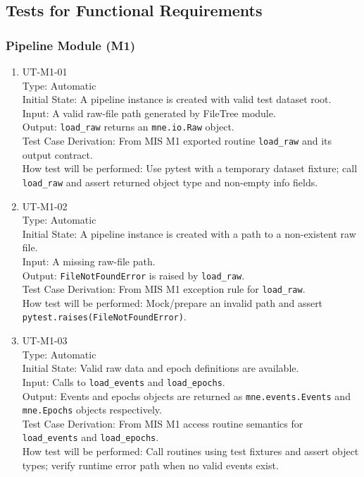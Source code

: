\documentclass[12pt, titlepage]{article}
\begin{document}
\subsection{Tests for Functional Requirements}




\subsubsection{Pipeline Module (M1)}

\begin{enumerate}

\item{UT-M1-01\\}
    Type: Automatic \\
    Initial State: A pipeline instance is created with valid test dataset root. \\
    Input: A valid raw-file path generated by FileTree module. \\
    Output: \lstinline|load_raw| returns an \lstinline|mne.io.Raw| object. \\
    Test Case Derivation: From MIS M1 exported routine \lstinline|load_raw| and its output contract. \\
    How test will be performed: Use pytest with a temporary dataset fixture; call \lstinline|load_raw| and assert returned object type and non-empty info fields.

\item{UT-M1-02\\}
    Type: Automatic \\
    Initial State: A pipeline instance is created with a path to a non-existent raw file. \\
    Input: A missing raw-file path. \\
    Output: \lstinline|FileNotFoundError| is raised by \lstinline|load_raw|. \\
    Test Case Derivation: From MIS M1 exception rule for \lstinline|load_raw|. \\
    How test will be performed: Mock/prepare an invalid path and assert \lstinline|pytest.raises(FileNotFoundError)|.

\item{UT-M1-03\\}
    Type: Automatic \\
    Initial State: Valid raw data and epoch definitions are available. \\
    Input: Calls to \lstinline|load_events| and \lstinline|load_epochs|. \\
    Output: Events and epochs objects are returned as \lstinline|mne.events.Events| and \lstinline|mne.Epochs| objects respectively. \\
    Test Case Derivation: From MIS M1 access routine semantics for \lstinline|load_events| and \lstinline|load_epochs|. \\
    How test will be performed: Call routines using test fixtures and assert object types; verify runtime error path when no valid events exist.

\end{enumerate}
\end{document}
